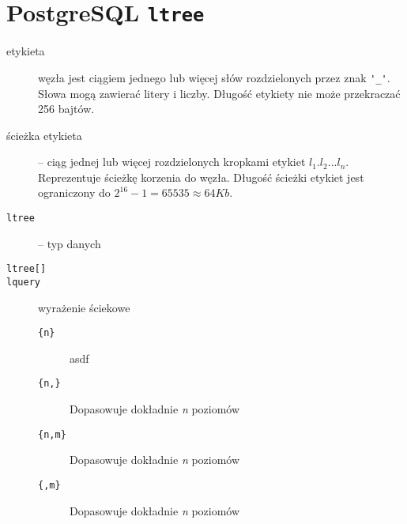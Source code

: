 \section{PostgreSQL \texttt{ltree}}



\begin{description}
    \item[etykieta]  węzła jest ciągiem jednego lub więcej słów rozdzielonych przez znak \verb|'_'|. 
        Słowa mogą zawierać litery i liczby.
        Długość etykiety nie może przekraczać 256 bajtów. 
    \item[ścieżka etykieta]
         -- ciąg jednej lub więcej rozdzielonych kropkami etykiet $l_1.l_2...l_n$. 
        Reprezentuje ścieżkę korzenia do węzła. 
        Długość ścieżki etykiet jest ograniczony do $2^{16} - 1 = 65535 \approx 64 Kb$. 
          

\end{description}


\begin{description}
    \item[\texttt{ltree}] -- typ danych
    \item[\texttt{ltree[]}]
    \item[\texttt{lquery}] wyrażenie ściekowe
    \begin{description}
        \item[\texttt{\{n\}}] asdf
        \item[\texttt{\{n,\}}] Dopasowuje dokładnie \emph{n} poziomów
        \item[\texttt{\{n,m\}}] Dopasowuje dokładnie \emph{n} poziomów
        \item[\texttt{\{,m\}}] Dopasowuje dokładnie \emph{n} poziomów
    \end{description}
\end{description}


